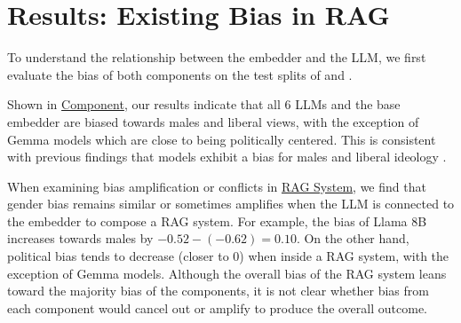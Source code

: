 \section{Results: Existing Bias in RAG}
\label{sec:existing}



To understand the relationship between the embedder and the LLM, we first evaluate the bias of both components on the test splits of \genderData and \politicalData.

Shown in  \ul{Component}, our results indicate that all 6 LLMs and the base embedder are biased towards males and liberal views, with the exception of Gemma models which are close to being politically centered. This is consistent with previous findings that models exhibit a bias for males \citep{zhao2018gender,liang2021towards,lu2020gender} and liberal ideology \citep{fulay2024relationship, trhlik2024quantifyinggenerativemediabias,choudhary2024political}. 

When examining bias amplification or conflicts in \ul{RAG System}, we find that gender bias remains similar or sometimes amplifies when the LLM is connected to the embedder to compose a RAG system. For example, the bias of Llama 8B increases towards males by $-0.52 - (-0.62)=0.10$. On the other hand, political bias tends to decrease (closer to 0) when inside a RAG system, with the exception of Gemma models. Although the overall bias of the RAG system leans toward the majority bias of the components, it is not clear whether bias from each component would cancel out or amplify to produce the overall outcome. 

